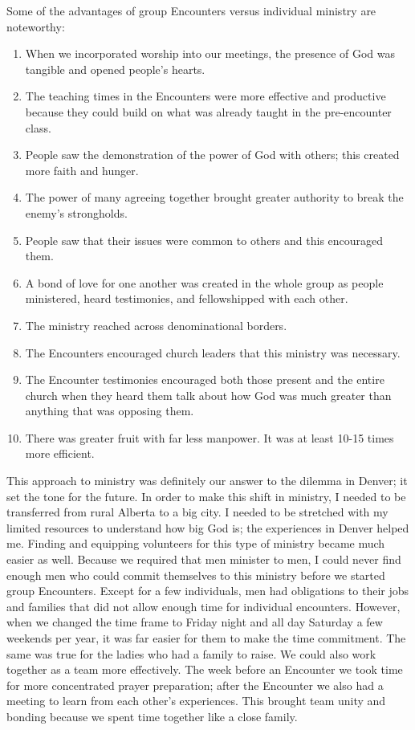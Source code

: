 \documentclass[oneside,12pt]{book}
\begin{document}
Some of the advantages of  group Encounters versus individual ministry are noteworthy:
\begin{enumerate}
	\item When we incorporated worship into our meetings, the presence of God was tangible and opened people's hearts.
	\item The teaching times in the Encounters were more effective and productive because they could build on what was already taught in the pre-encounter class.
	\item People saw the demonstration of the power of God with others; this created more faith and hunger.
	\item The power of many agreeing together brought greater authority to break the enemy's strongholds.
	\item People saw that their issues were common to others and this encouraged them.
	\item A bond of love for one another was created in the whole group as people ministered, heard testimonies, and fellowshipped with each other.
	\item The ministry reached across denominational borders. 
	\item The Encounters encouraged church leaders that this ministry was necessary.
	\item The Encounter testimonies encouraged both those present and the entire church when they heard them talk about how God was much greater than anything that was opposing them.
	\item There was greater fruit with far less manpower. It was at least 10-15 times more efficient.
\end{enumerate}

This approach to ministry was definitely our answer to the dilemma in Denver; it set the tone for the future. In order to make this shift in ministry, I needed to be transferred from rural Alberta to a big city. I needed to be stretched with my limited resources to understand how big God is; the experiences in Denver helped me. Finding and equipping volunteers for this type of ministry became much easier as well. Because we required that men minister to men, I could never find enough men who could commit themselves to this ministry before we started group Encounters. Except for a few individuals, men had obligations to their jobs and families that did not allow enough time for individual encounters. However, when we changed the time frame to Friday night and all day Saturday a few weekends per year, it was far easier for them to make the time commitment. The same was true for the ladies who had a family to raise. We could also work together as a team more effectively. The week before an Encounter we took time for more concentrated prayer preparation; after the Encounter we also had a meeting to learn from each other's experiences. This brought team unity and bonding because we spent time together like a close family. 
\end{document}
